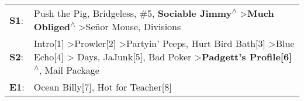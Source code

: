 \begin{supertabular}{p{0.03\textwidth}p{0.92\textwidth}}
 \textbf{S1}:  &                                                                                                                                                           Push the Pig\textsuperscript{}, \enspace Bridgeless\textsuperscript{}, \enspace \#5\textsuperscript{}, \enspace \textbf{Sociable Jimmy\textsuperscript{$\wedge$}} \textgreater \enspace \textbf{Much Obliged\textsuperscript{$\wedge$}} \textgreater \enspace Señor Mouse\textsuperscript{}, \enspace Divisions\textsuperscript{}  \enspace  \\
 \textbf{S2}:  &  Intro[1]\textsuperscript{} \textgreater \enspace Prowler[2]\textsuperscript{} \textgreater \enspace Partyin' Peeps\textsuperscript{}, \enspace Hurt Bird Bath[3]\textsuperscript{} \textgreater \enspace Blue Echo[4]\textsuperscript{} \textgreater {} Days\textsuperscript{}, \enspace JaJunk[5]\textsuperscript{}, \enspace Bad Poker\textsuperscript{} \textgreater \enspace \textbf{Padgett's Profile[6]\textsuperscript{$\wedge$}}, \enspace Mail Package\textsuperscript{}  \enspace  \\
 \textbf{E1}:  &                                                                                                                                                                                                                                                                                                                                                                                                             Ocean Billy[7]\textsuperscript{}, \enspace Hot for Teacher[8]\textsuperscript{}  \enspace  \\
\end{supertabular}
